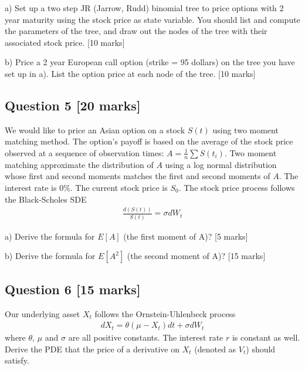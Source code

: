 \documentclass[11pt,a4paper,hidelinks,fleqn]{article}            %
\begin{document}
a) Set up a two step JR (Jarrow, Rudd) binomial tree to price options with 2 year maturity using the stock price as state variable.
You should list and compute the parameters of the tree, and draw out the nodes of the tree with their associated stock price. [10 marks]
\vspace{8.5cm}

b) Price a 2 year European call option (strike = 95 dollars) on the tree you have set up in a). List the option price at each node of the tree.  [10 marks]
\newpage

\subsection*{Question 5 [20 marks]}
We would like to price an Asian option on a stock $S(t)$ using two moment matching method.
The option's payoff is based on the average of the stock price observed at a sequence of observation times: $A = \frac{1}{n}\sum S(t_i)$.
Two moment matching approximate the distribution of $A$ using a log normal distribution whose first and second moments matches the first and second moments of $A$.
The interest rate is 0\%. The current stock price is $S_0$.
The stock price process follows the Black-Scholes SDE
\begin{align*}
\frac{d(S(t))}{S(t)} = \sigma dW_t
\end{align*}

a) Derive the formula for $E[A]$ (the first moment of A)? [5 marks]
\vspace{3cm}

b) Derive the formula for $E[A^2]$ (the second moment of A)? [15 marks]
\newpage


\subsection*{Question 6 [15 marks]}
Our underlying asset $X_t$ follows the Ornstein-Uhlenbeck process
\begin{align*}
d X_t = \theta(\mu - X_t) dt + \sigma dW_t
\end{align*}
where $\theta$, $\mu$ and $\sigma$ are all positive constants. The interest rate $r$ is constant as well.
Derive the PDE that the price of a derivative on $X_t$ (denoted as $V_t$) should satisfy. 
\end{document}
